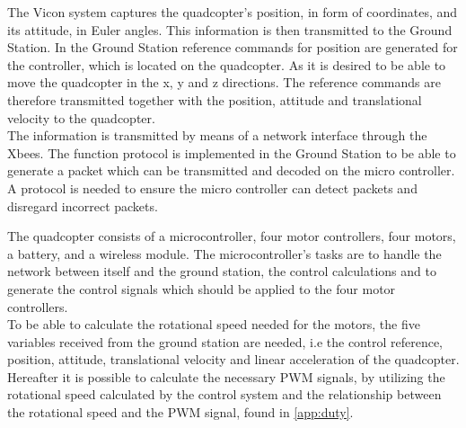 The Vicon system captures the quadcopter's position, in form of coordinates, and its attitude, in Euler angles. This information is then transmitted to the Ground Station. In the Ground Station reference commands for position are generated for the controller, which is located on the quadcopter. As it is desired to be able to move the quadcopter in the x, y and z directions. The reference commands are therefore transmitted together with the position, attitude and translational velocity to the quadcopter. \\ The information is transmitted by means of a network interface through the Xbees. The function protocol is implemented in the Ground Station to be able to generate a packet which can be transmitted and decoded on the micro controller. A protocol is needed to ensure the micro controller can detect packets and disregard incorrect packets.

The quadcopter consists of a microcontroller, four motor controllers, four motors, a battery, and a wireless module. The microcontroller's tasks are to handle the network between itself and the ground station, the control calculations and to generate the control signals which should be applied to the four motor controllers. \\
To be able to calculate the rotational speed needed for the motors, the five variables received from the ground station are needed, i.e the control reference, position, attitude, translational velocity and linear acceleration of the quadcopter. Hereafter it is possible to calculate the necessary PWM signals, by utilizing the rotational speed calculated by the control system and the relationship between the rotational speed and the PWM signal, found in \autoref{app:duty}.




